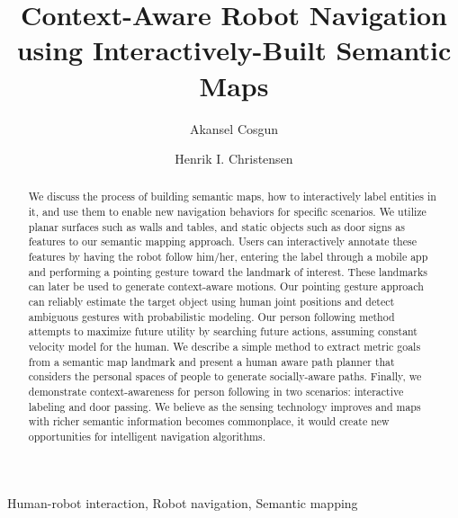 \documentclass[3p]{elsarticle}
\begin{document}
\begin{frontmatter}

\title{Context-Aware Robot Navigation using Interactively-Built Semantic Maps}


\author{Akansel Cosgun}
\address[mymainaddress]{Honda Research Institute, 375 Ravendale Dr, Mountain View, CA, USA, 94043}

\author{Henrik I. Christensen}
\address[mysecondaryaddress]{University of California San Diego, 9500 Gilman Dr, La Jolla, CA, 92093}



\begin{abstract}
We discuss the process of building semantic maps, how to interactively label entities in it, and use them to enable new navigation behaviors for specific scenarios. We utilize planar surfaces such as walls and tables, and static objects such as door signs as features to our semantic mapping approach. Users can interactively annotate these features by having the robot follow him/her, entering the label through a mobile app and performing a pointing gesture toward the landmark of interest. These landmarks can later be used to generate context-aware motions. Our pointing gesture approach can reliably estimate the target object using human joint positions and detect ambiguous gestures with probabilistic modeling. Our person following method attempts to maximize future utility by searching future actions, assuming constant velocity model for the human. We describe a simple method to extract metric goals from a semantic map landmark and present a human aware path planner that considers the personal spaces of people to generate socially-aware paths. Finally, we demonstrate context-awareness for person following in two scenarios: interactive labeling and door passing. We believe as the sensing technology improves and maps with richer semantic information becomes commonplace, it would create new opportunities for intelligent navigation algorithms.
\end{abstract}

\begin{keyword}
Human-robot interaction, Robot navigation, Semantic mapping
\end{keyword}

\end{frontmatter}
\end{document}
